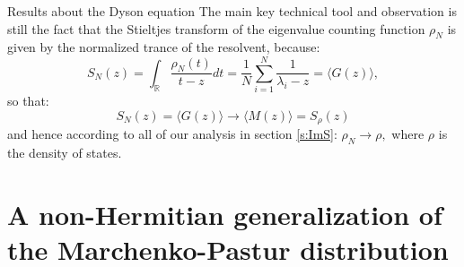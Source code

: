 \documentclass[11pt, a4paper, oneside]{book}
\numberwithin{equation}{chapter}
\begin{document}
\begin{section}{Results about the Dyson equation}
The main key technical tool and observation is still the fact that the Stieltjes transform of the eigenvalue counting function $\rho_N$ is given by the normalized trance of the resolvent, because:
\[
S_N(z) = \int_{\mathbb{R}} \frac{\rho_N(t)}{t - z} dt = \frac{1}{N} \sum \limits_{i=1}^N \frac{1}{\lambda_i - z} = \langle G(z) \rangle,
\]
so that:
\[
S_N(z) = \langle G(z) \rangle \to \langle M(z) \rangle = S_{\rho}(z)
\]
and hence according to all of our analysis in section \ref{s:ImS}: $\rho_N \to \rho,$ where $\rho$ is the density of states.
\end{section}
\chapter{A non-Hermitian generalization of the Marchenko-Pastur distribution}
\end{document}
